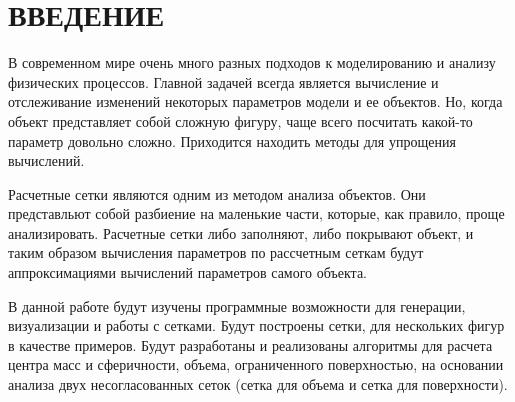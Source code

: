 \chapter*{\large ВВЕДЕНИЕ}  
В современном мире очень много разных подходов к моделированию и анализу физических процессов. Главной задачей всегда является вычисление и отслеживание изменений некоторых параметров модели и ее объектов. Но, когда объект представляет собой сложную фигуру, чаще всего посчитать какой-то параметр довольно сложно. Приходится находить методы для упрощения вычислений.

Расчетные сетки являются одним из методом анализа объектов. Они представльют собой разбиение на маленькие части, которые, как правило, проще анализировать. Расчетные сетки либо заполняют, либо покрывают объект, и таким образом вычисления параметров по рассчетным сеткам будут аппроксимациями вычислений параметров самого объекта.  

В данной работе будут изучены программные возможности для генерации, визуализации и работы с сетками. Будут построены сетки, для нескольких фигур в качестве примеров. Будут разработаны и реализованы алгоритмы для расчета центра масс и сферичности, объема, ограниченного поверхностью, на основании анализа двух несогласованных сеток (сетка для объема и сетка для поверхности).